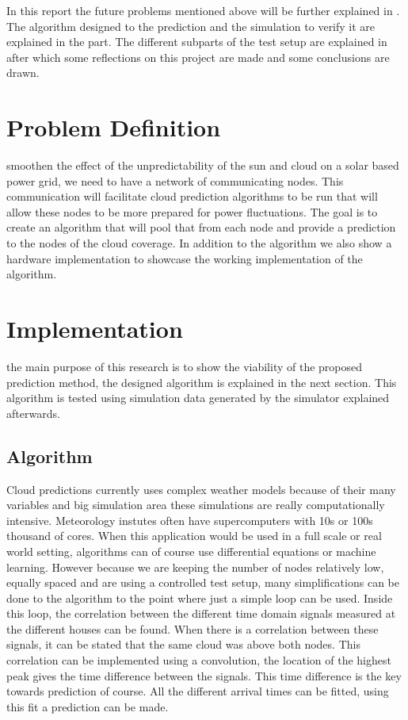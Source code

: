 \documentclass[a4paper,journal]{DDREAM}
\begin{document}
In this report the future problems mentioned above will be further explained in .
The algorithm designed to the prediction and the simulation to verify it are explained in the  part.
The different subparts of the test setup are explained in  after which some reflections on this project are made and some conclusions are drawn.

\section{Problem Definition}\label{sec:problem_definition}
 smoothen the effect of the unpredictability of the sun and cloud on a solar based power grid, we need to have a network of communicating nodes. This communication will facilitate cloud prediction algorithms to be run that will allow these nodes to be more prepared for power fluctuations. The goal is to create an algorithm that will pool that from each node and provide a prediction to the nodes of the cloud coverage. In addition to the algorithm we also show a hardware implementation to showcase the working implementation of the algorithm.\clearpage

\section{Implementation}\label{sec:implementation}
 the main purpose of this research is to show the viability of the proposed prediction method, the designed algorithm is explained in the next section.
This algorithm is tested using simulation data generated by the simulator explained afterwards.

\subsection{Algorithm}\label{sec:implementation-algorithm}
Cloud predictions currently uses complex weather models because of their many variables and big simulation area these simulations are really computationally intensive.
Meteorology instutes often have supercomputers with 10s or 100s thousand of cores.
When this application would be used in a full scale or real world setting, algorithms can of course use differential equations or machine learning.
However because we are keeping the number of nodes relatively low, equally spaced and are using a controlled test setup, many simplifications can be done to the algorithm to the point where just a simple loop can be used.
Inside this loop, the correlation between the different time domain signals measured at the different houses can be found.
When there is a correlation between these signals, it can be stated that the same cloud was above both nodes.
This correlation can be implemented using a convolution, the location of the highest peak gives the time difference between the signals.
This time difference is the key towards prediction of course.
All the different arrival times can be fitted, using this fit a prediction can be made.
\end{document}
